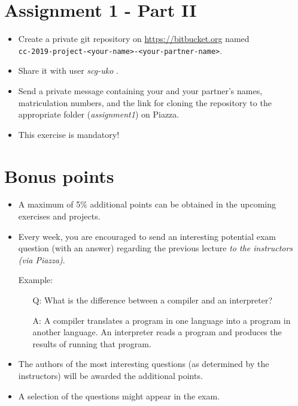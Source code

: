 \section{Assignment 1 - Part II}

\begin{itemize}
\item Create a private git repository on \url{https://bitbucket.org} named\\
  \texttt{cc-2019-project-<your-name>-<your-partner-name>}.
\item Share it with user \emph{scg-uko} .
\item Send a private message containing your and your partner's names, matriculation numbers, and the link for cloning the repository to the appropriate folder (\emph{assignment1}) on Piazza.
\item This exercise is mandatory!
\end{itemize}

\section{Bonus points}

\begin{itemize}
\item A maximum of 5\% additional points can be obtained in the upcoming exercises and projects.
\item Every week, you are encouraged to send an interesting potential exam question (with an answer) regarding the previous lecture \emph{to the instructors (via Piazza)}.

Example:
\begin{itemize}
\item[Q:] What is the difference between a compiler and an interpreter?
\item[A:] A compiler translates a program in one language into a program in another language. An interpreter reads a program and produces the results of running that program.
\end{itemize}

\item The authors of the most interesting questions (as determined by the instructors) will be awarded the additional points.
\item A selection of the questions might appear in the exam.
\end{itemize}



